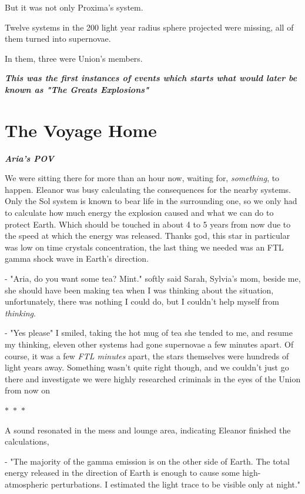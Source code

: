 \documentclass[colorlinks,12pt,a4paper]{book}
\newcommand\sep{\begin{center}
  \boldmath $\ast$~$\ast$~$\ast$
\end{center}}
\begin{document}
 But it was not only Proxima's system.\par
 \bigskip
 Twelve systems in the 200 light year radius sphere projected were missing, all of them turned into supernovae.\par
 \bigskip
 In them, three were Union's members.\par
 \bigskip
 \textit{\textbf{This was the first instances of events which starts what would later be known as "The Greats Explosions"}}
 
 \chapter{The Voyage Home}
 \textit{\textbf{Aria's POV}}\par 
 \bigskip
 
 We were sitting there for more than an hour now, waiting for, \textit{something}, to happen.
 Eleanor was busy calculating the consequences for the nearby systems. Only the Sol system is known to bear life 
 in the surrounding one, so we only had to calculate how much energy the explosion caused and what we can do to protect Earth.
 Which should be touched in about 4 to 5 years from now due to the speed at which the energy was released. Thanks god, this star in 
 particular was low on time crystals concentration, the last thing we needed was an FTL gamma shock wave in Earth's direction.\par
 \bigskip
 
 - "Aria, do you want some tea? Mint." softly said Sarah, Sylvia's mom, beside me, she should have been making tea when I was 
 thinking about the situation, unfortunately, there was nothing I could do, but I couldn't help myself from \textit{thinking}.\par 
 \bigskip
 
 - "Yes please" I smiled, taking the hot mug of tea she tended to me, and resume my thinking, eleven other systems had gone supernovae
 a few minutes apart. Of course, it was a few \textit{FTL minutes} apart, the stars themselves were hundreds of light years away. 
 Something wasn't quite right though, and we couldn't just go there and investigate we were highly researched criminals in the eyes of the 
 Union from now on\par 
 \bigskip
 
 \sep 
 
 A sound resonated in the mess and lounge area, indicating Eleanor finished the calculations,\par
 - "The majority of the gamma emission is on the other side of Earth. The total energy released in the direction 
 of Earth is enough to cause some high-atmospheric perturbations. I estimated the light trace to be visible only at night."\par
 \bigskip
 
\end{document}
